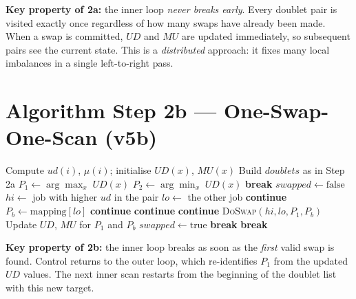 \documentclass[10pt,twocolumn]{article}
\begin{document}
\textbf{Key property of 2a:} the inner loop \emph{never breaks early}. Every
doublet pair is visited exactly once regardless of how many swaps have already
been made. When a swap is committed, $UD$ and $MU$ are updated immediately,
so subsequent pairs see the current state. This is a \emph{distributed}
approach: it fixes many local imbalances in a single left-to-right pass.

\section{Algorithm Step 2b --- One-Swap-One-Scan (v5b)}

\begin{algorithm}[H]
\caption{Refine Mapping --- Step 2b}
\begin{algorithmic}[1]
\State Compute $ud(i)$, $\mu(i)$; initialise $UD(x)$, $MU(x)$
\State Build $\mathit{doublets}$ as in Step 2a
\Loop
  \State $P_1 \leftarrow \arg\max_x\; UD(x)$
  \State $P_2 \leftarrow \arg\min_x\; UD(x)$
   \textbf{break} \EndIf
  \State $\mathit{swapped} \leftarrow \text{false}$
    \State $\mathit{hi} \leftarrow$ job with higher $ud$ in the pair
    \State $\mathit{lo} \leftarrow$ the other job
     \textbf{continue} \EndIf
    \State $P_b \leftarrow \text{mapping}[\mathit{lo}]$
     \textbf{continue} \EndIf
      \textbf{continue} 
    \EndIf
      \textbf{continue} 
    \EndIf
      \State \textsc{DoSwap}$(\mathit{hi},\mathit{lo},P_1,P_b)$
      \State Update $UD$, $MU$ for $P_1$ and $P_b$
      \State $\mathit{swapped} \leftarrow \text{true}$
      \State \textbf{break} 
    \EndIf
  \EndFor
   \textbf{break} \EndIf
\EndLoop
\end{algorithmic}
\end{algorithm}

\textbf{Key property of 2b:} the inner loop breaks as soon as the
\emph{first} valid swap is found. Control returns to the outer loop, which
re-identifies $P_1$ from the updated $UD$ values. The next inner scan
restarts from the beginning of the doublet list with this new target.
\end{document}
